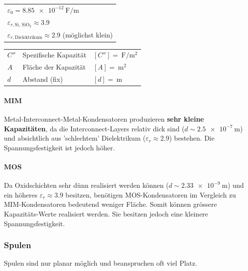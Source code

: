\begin{minipage}[t]{0.44\columnwidth}
    \begin{tabular}{l@{}}
        $\varepsilon_0 = \qty{8.85e-12}{\farad\per\meter}$                      \\
        $\varepsilon_{r, \text{Si, SiO$_2$}} \approx 3.9$                       \\
        $\varepsilon_{r, \text{Dielektrikum}} \approx 2.9$ (möglichst klein)   
    \end{tabular}   
\end{minipage}
\hfill
\begin{minipage}[t]{0.55\columnwidth}
    \begin{tabular}{lll@{}}
        $C''$   & Spezifische Kapazität & $[C''] = \qty{}{\farad\per\square\meter}$ \\
        $A$     & Fläche der Kapazität  & $[A] = \qty{}{\square\meter}$             \\
        $d$     & Abstand (fix)         & $[d] = \qty{}{\meter}$
    \end{tabular}
\end{minipage}



\paragraph{MIM}
Metal-Interconnect-Metal-Kondensatoren produzieren \textbf{sehr kleine Kapazitäten}, da die Interconnect-Layers relativ dick sind ($d \sim \qty{2.5e-7}{\meter}$) und absichtlich aus 'schlechtem' Dielektrikum ($\varepsilon_r \approx 2.9$) bestehen.
Die Spannungsfestigkeit ist jedoch höher.

\paragraph{MOS}
Da Oxidschichten sehr dünn realisiert werden können ($d \sim \qty{2.33e-9}{\meter}$) und ein höheres $\varepsilon_r \approx 3.9$ besitzen, benötigen MOS-Kondensatoren im Vergleich zu MIM-Kondensatoren bedeutend weniger Fläche.
Somit können grössere Kapazitäts-Werte realisiert werden.
Sie besitzen jedoch eine kleinere Spannungsfestigkeit.


\subsubsection{Spulen}
Spulen sind nur planar möglich und beanspruchen oft viel Platz.

